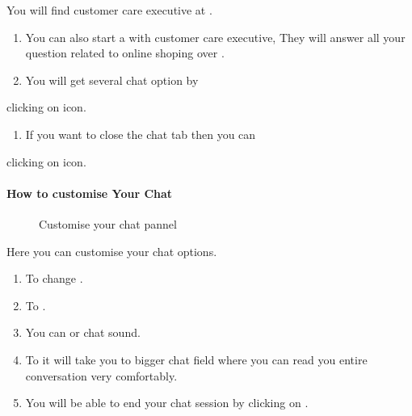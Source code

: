 \documentclass[a4paper,10pt,english]{report}
\begin{document}
You will find customer care executive at .
\begin{enumerate}
\def\theenumi{\arabic{enumi}}
\def\labelenumi{\theenumi .}
\makeatletter\def\p@enumii{\p@enumi \theenumi .}\makeatother
\setcounter{enumi}{6}
\item {} 
You can also start a  with customer care executive, They will answer all your question related to online shoping over .

\item {} 
You will get several chat option by

\end{enumerate}

clicking on  icon.
\begin{enumerate}
\def\theenumi{\arabic{enumi}}
\def\labelenumi{\theenumi .}
\makeatletter\def\p@enumii{\p@enumi \theenumi .}\makeatother
\setcounter{enumi}{8}
\item {} 
If you want to close the chat tab then you can

\end{enumerate}

clicking on  icon.


\paragraph{How to customise Your Chat}
\label{\detokenize{custChatoption:how-to-customise-your-chat}}\label{\detokenize{custChatoption::doc}}
\begin{figure}[htbp]
\centering
\capstart

\noindent{}
\caption{Customise your chat pannel}\label{\detokenize{custChatoption:id2}}\label{\detokenize{custChatoption:id1}}\end{figure}

Here you can customise your chat options.
\begin{enumerate}
\def\theenumi{\arabic{enumi}}
\def\labelenumi{\theenumi .}
\makeatletter\def\p@enumii{\p@enumi \theenumi .}\makeatother
\item {} 
To change .

\item {} 
To .

\item {} 
You can  or  chat sound.

\item {} 
To  it will take you to bigger chat field where you can read you entire conversation very comfortably.

\item {} 
You will be able to end your chat session by clicking on .

\end{enumerate}
\end{document}
